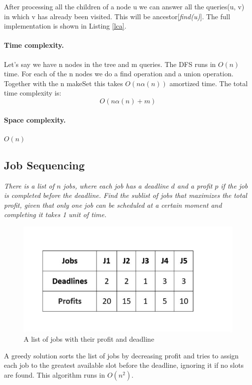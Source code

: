 \documentclass{article}
\begin{document}
After processing all the children of a node u we can answer all the
queries(u, v) in which v has already been visited. This will be ancestor[\emph{find(u)}]. The full implementation
is shown in Listing \ref{lca}.

\paragraph{Time complexity.} Let's say we have n nodes in the tree and m queries.
The DFS runs in $O(n)$ time. For each of the n nodes we do a find operation and a union operation. Together
with the n makeSet this takes $O(n\alpha(n))$ amortized time.
The total time complexity is: 
$$O(n\alpha(n) + m)$$

\paragraph{Space complexity.} $O(n)$


\subsection{Job Sequencing}
\emph{There is a list of $n$ jobs, where each job has a deadline $d$ and a profit $p$ if the job
is completed before the deadline. Find the sublist of jobs that maximizes the total profit, given
that only one job can be scheduled at a certain moment and completing it takes 1 unit of time.}
\begin{figure}[h!]
    \centering
    \includegraphics[scale=0.5]{img/jobs.jpeg}
    \caption{A list of jobs with their profit and deadline}
\end{figure}

\bigskip
A greedy solution \cite{key} sorts the list of jobs by decreasing profit and tries to assign each job to the greatest available slot before the deadline, ignoring it if no slots
are found. This algorithm runs in $O(n^2)$.
\end{document}
